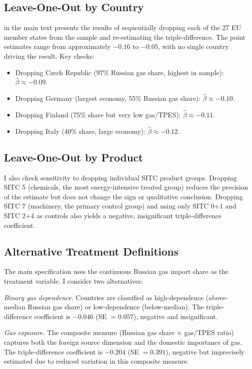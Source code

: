 \documentclass[12pt]{article}
\begin{document}
\subsection{Leave-One-Out by Country}

 in the main text presents the results of sequentially dropping each of the 27 EU member states from the sample and re-estimating the triple-difference. The point estimates range from approximately $-0.16$ to $-0.05$, with no single country driving the result. Key checks:
\begin{itemize}
\item Dropping Czech Republic (97\% Russian gas share, highest in sample): $\hat{\beta} \approx -0.09$.
\item Dropping Germany (largest economy, 55\% Russian gas share): $\hat{\beta} \approx -0.10$.
\item Dropping Finland (75\% share but very low gas/TPES): $\hat{\beta} \approx -0.11$.
\item Dropping Italy (40\% share, large economy): $\hat{\beta} \approx -0.12$.
\end{itemize}

\subsection{Leave-One-Out by Product}

I also check sensitivity to dropping individual SITC product groups. Dropping SITC 5 (chemicals, the most energy-intensive treated group) reduces the precision of the estimate but does not change the sign or qualitative conclusion. Dropping SITC 7 (machinery, the primary control group) and using only SITC 0+1 and SITC 2+4 as controls also yields a negative, insignificant triple-difference coefficient.

\subsection{Alternative Treatment Definitions}

The main specification uses the continuous Russian gas import share as the treatment variable. I consider two alternatives:

\textit{Binary gas dependence.} Countries are classified as high-dependence (above-median Russian gas share) or low-dependence (below-median). The triple-difference coefficient is $-0.046$ (SE $= 0.057$), negative and insignificant.

\textit{Gas exposure.} The composite measure (Russian gas share $\times$ gas/TPES ratio) captures both the foreign source dimension and the domestic importance of gas. The triple-difference coefficient is $-0.204$ (SE $= 0.391$), negative but imprecisely estimated due to reduced variation in this composite measure.
\end{document}
